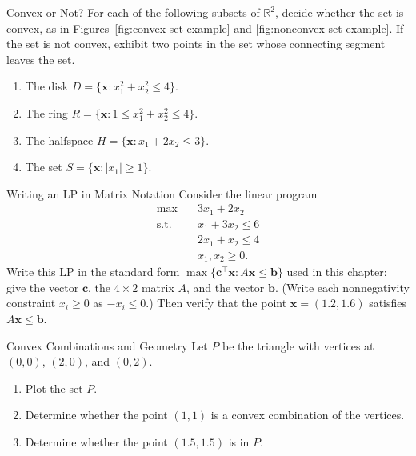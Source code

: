 \begin{ex}{Convex or Not?}{}
\label{ex:convex-or-not}
For each of the following subsets of \( \mathbb{R}^2 \), decide whether the set is convex, as in Figures~\ref{fig:convex-set-example} and \ref{fig:nonconvex-set-example}. If the set is not convex, exhibit two points in the set whose connecting segment leaves the set.
\begin{enumerate}
    \item The disk \( D = \{ \mathbf{x} : x_1^2 + x_2^2 \leq 4 \} \).
    \item The ring \( R = \{ \mathbf{x} : 1 \leq x_1^2 + x_2^2 \leq 4 \} \).
    \item The halfspace \( H = \{ \mathbf{x} : x_1 + 2x_2 \leq 3 \} \).
    \item The set \( S = \{ \mathbf{x} : |x_1| \geq 1 \} \).
\end{enumerate}
\exrefs{\S\ref{sec:convexity}}
\end{ex}

\begin{ex}{Writing an LP in Matrix Notation}{}
\label{ex:lp-matrix-notation}
Consider the linear program
\begin{align*}
\max \quad & 3x_1 + 2x_2\\
\text{s.t.} \quad & x_1 + 3x_2 \leq 6\\
& 2x_1 + x_2 \leq 4\\
& x_1, x_2 \geq 0.
\end{align*}
Write this LP in the standard form \( \max\{ \mathbf{c}^\top \mathbf{x} : A\mathbf{x} \leq \mathbf{b} \} \) used in this chapter: give the vector \( \mathbf{c} \), the \( 4 \times 2 \) matrix \( A \), and the vector \( \mathbf{b} \). (Write each nonnegativity constraint \( x_i \geq 0 \) as \( -x_i \leq 0 \).) Then verify that the point \( \mathbf{x} = (1.2, 1.6) \) satisfies \( A\mathbf{x} \leq \mathbf{b} \).
\exrefs{\S\ref{sec:math-preliminaries}, \S\ref{sec:algebraic-vertex-proof}}
\end{ex}


\begin{ex}{Convex Combinations and Geometry}{}
\label{ex:convex-combo-triangle}
Let \( P \) be the triangle with vertices at \( (0,0) \), \( (2,0) \), and \( (0,2) \).
\begin{enumerate}
    \item Plot the set \( P \).
    \item Determine whether the point \( (1,1) \) is a convex combination of the vertices.
    \item Determine whether the point \( (1.5,1.5) \) is in \( P \).
\end{enumerate}
\exrefs{\S\ref{sec:convexity}}
\end{ex}


